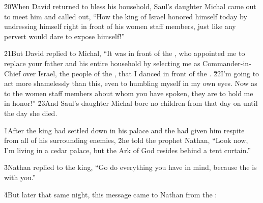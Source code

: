 \v{20}When David returned to bless his household, Saul's daughter Michal came out to meet him and called out, ``How the king of Israel honored himself today by undressing himself right in front of his women staff members, just like any pervert would dare to expose himself!''

\v{21}But David replied to Michal, ``It was in front of the , who appointed me to replace your father and his entire household by selecting me as Commander-in-Chief over Israel, the people of the , that I danced in front of the . \v{22}I'm going to act more shamelessly than this, even to humbling myself in my own eyes. Now as to the women staff members about whom you have spoken, they are to hold me in honor!'' \v{23}And Saul's daughter Michal bore no children from that day on until the day she died.

\v{1}After the king had settled down in his palace and the  had given him respite from all of his surrounding enemies, \v{2}he told the prophet Nathan, ``Look now, I'm living in a cedar palace, but the Ark of God resides behind a tent curtain.''

\v{3}Nathan replied to the king, ``Go do everything you have in mind, because the  is with you.''

\v{4}But later that same night, this message came to Nathan from the :

